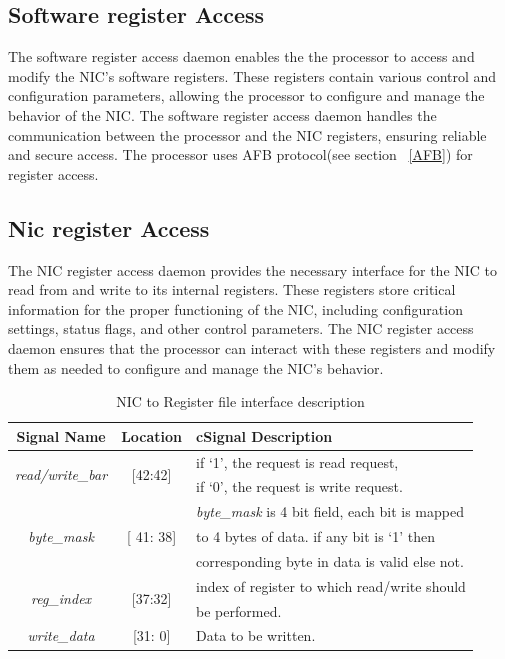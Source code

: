 \documentclass[12pt]{report}
\begin{document}
			\subsection{Software register Access}
				The software register access daemon enables the the processor to access and modify the NIC's software registers. These registers contain various control and configuration parameters, allowing the processor to configure and manage the behavior of the NIC. The software register access daemon handles the communication between the processor and the NIC registers, ensuring reliable and secure access. The processor uses AFB protocol(see section ~\ref{AFB}) for register access.\\

	

		\subsection{Nic register Access}
				The NIC register access daemon provides the necessary interface for the NIC to read from and write to its internal registers. These registers store critical information for the proper functioning of the NIC, including configuration settings, status flags, and other control parameters. The NIC register access daemon ensures that the processor can interact with these registers and modify them as needed to configure and manage the NIC's behavior.\\
		\begin{table}[!htbp]
					\centering
					\begin{tabular}{ccl}
						\hline
						\textbf{Signal Name} 			& \textbf{Location} 		&{c}\textbf{Signal Description}  \\ \hline
						\multirow{2}{*}{\textit{read/write\_bar}}& \multirow{2}{*}{[42:42]}	& if `1', the request is read request,\\ 
											& 				& if `0', the request is write request.\\ \hline
						\multirow{3}{*}{\textit{byte\_mask}}	& \multirow{3}{*}{[ 41: 38]}	& \textit{byte\_mask} is 4 bit field, each bit is mapped\\
											&				& to 4 bytes of data. if any bit is `1' then\\
											& 				& corresponding byte in data is valid else not.\\ \hline 
						\multirow{2}{*}{\textit{reg\_index}}   	& \multirow{2}{*}{[37:32]} 	& index of register to which read/write should\\ 
											&				& be performed.\\ \hline
						\textit{write\_data}   			& [31: 0] 			& Data to be written.\\ \hline
					\end{tabular}
					\caption{NIC to Register file interface description}
					\label{tab:NIC-Reg-interface-req}
				\end{table}
\end{document}
